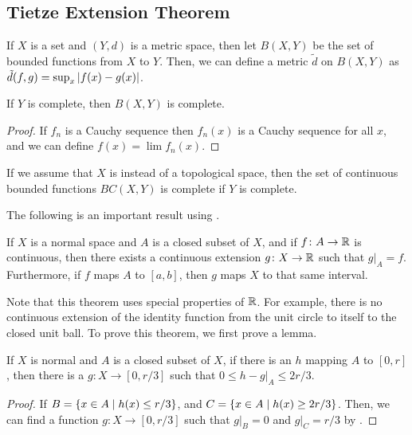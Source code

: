 \subsection{Tietze Extension Theorem}

If $X$ is a set and $(Y, d)$ is a metric space, then let $B(X, Y)$ be the set of bounded functions from $X$ to $Y$. Then, we can define a metric $\tilde d$ on $B(X, Y)$ as $\tilde d(f, g) = \sup_x \abs{f(x) - g(x)}$.

\begin{proposition}
    If $Y$ is complete, then $B(X, Y)$ is complete.
\end{proposition}

\begin{proof}
    If $f_n$ is a Cauchy sequence then $f_n(x)$ is a Cauchy sequence for all $x$, and we can define $f(x) = \lim f_n(x)$.
\end{proof}

\begin{proposition}
    If we assume that $X$ is instead of a topological space, then the set of continuous bounded functions $BC(X, Y)$ is complete if $Y$ is complete.
\end{proposition}

The following is an important result using .

\begin{theorem}
    \label{thm:tietze}
    If $X$ is a normal space and $A$ is a closed subset of $X$, and if $f \colon A \to \mathbb R$ is continuous, then there exists a continuous extension $g \colon X \to \mathbb R$ such that $g\vert_A = f$. Furthermore, if $f$ maps $A$ to $[a, b]$, then $g$ maps $X$ to that same interval.
\end{theorem}

Note that this theorem uses special properties of $\mathbb R$. For example, there is no continuous extension of the identity function from the unit circle to itself to the closed unit ball. To prove this theorem, we first prove a lemma.

\begin{lemma}
    If $X$ is normal and $A$ is a closed subset of $X$, if there is an $h$ mapping $A$ to $[0, r]$, then there is a $g\colon X \to [0, r/3]$ such that $0 \le h - g\vert_A \le 2r/3$.
\end{lemma}

\begin{proof}
    If $B = \qty{x \in A \mid h(x) \le r/3}$, and $C = \qty{x \in A \mid h(x) \ge 2r/3}$. Then, we can find a function $g\colon X \to [0, r/3]$ such that $g\vert_B = 0$ and $g\vert_C = r/3$ by .
\end{proof}

